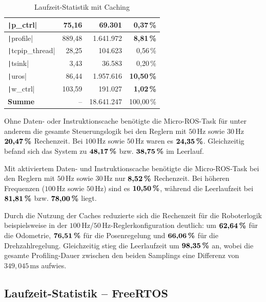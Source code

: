 \begin{table}[H]
{{\begin{minipage}[b]{0.50\hsize}
\begin{tabular}{|l|r|r|r|}
        \texttt|p_ctrl| & 75,16 & 69.301 & \textbf{0,37\,\%} \\ \hline
        \texttt|profile| & 889,48 & 1.641.972 & \textbf{8,81\,\%} \\ \hline
        \texttt|tcpip_thread| & 28,25 & 104.623 & 0,56\,\% \\ \hline
        \texttt|tsink| & 3,43 & 36.583 & 0,20\,\% \\ \hline
        \texttt|uros| & 86,44 & 1.957.616 & \textbf{10,50\,\%} \\ \hline
        \texttt|w_ctrl| & 103,59 & 191.027 & \textbf{1,02\,\%} \\ \hline
        \hline
        \textbf{Summe} & -- & 18.641.247 & 100,00\,\% \\ \hline
        \end{tabular}
        \caption{Laufzeit-Statistik mit Caching}
    \end{minipage}
}}
\end{table}

Ohne Daten- oder Instruktionscache benötigte die Micro-ROS-Task für unter
anderem die gesamte Steuerungslogik bei den Reglern mit $50\,\text{Hz}$ sowie
$30\,\text{Hz}$ $\textbf{20,47\,\%}$ Rechenzeit. Bei $100\,\text{Hz}$ sowie
$50\,\text{Hz}$ waren es $\textbf{24,35\,\%}$. Gleichzeitig befand sich das
System zu $\textbf{48,17\,\%}$ bzw. $\textbf{38,75\,\%}$ im Leerlauf.

Mit aktiviertem Daten- und Instruktionscache benötigte die Micro-ROS-Task bei
den Reglern mit $50\,\text{Hz}$ sowie $30\,\text{Hz}$ nur $\textbf{8,52\,\%}$
Rechenzeit. Bei höheren Frequenzen ($100\,\text{Hz}$ sowie $50\,\text{Hz}$) sind
es $\textbf{10,50\,\%}$, während die Leerlaufzeit bei $\textbf{81,81\,\%}$ bzw.
$\textbf{78,00\,\%}$ liegt.

Durch die Nutzung der Caches reduzierte sich die Rechenzeit für die Roboterlogik
beispielsweise in der $100\,\text{Hz}/50\,\text{Hz}$-Reglerkonfiguration
deutlich: um $\textbf{62,64\,\%}$ für die Odometrie, $\textbf{76,51\,\%}$ für
die Posenregelung und $\textbf{66,06\,\%}$ für die Drehzahlregelung.
Gleichzeitig stieg die Leerlaufzeit um $\textbf{98,35\,\%}$ an, wobei die
gesamte Profiling-Dauer zwischen den beiden Samplings eine Differenz von
$349,\!045\,\text{ms}$ aufwies.

\subsection{Laufzeit-Statistik -- FreeRTOS}

